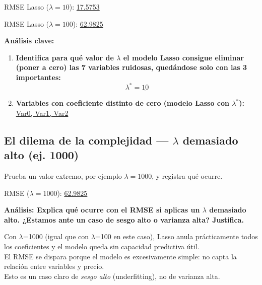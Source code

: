 \documentclass[12pt,oneside]{book}
\begin{document}
\vspace{0.4cm}
\begin{center}
\end{center}
\noindent RMSE Lasso ($\lambda=10$): \underline{17.5753}

\vspace{0.4cm}
\begin{center}
\end{center}
\noindent RMSE Lasso ($\lambda=100$): \underline{62.9825}

\newpage
\noindent\textbf{Análisis clave:}
\begin{enumerate}
    \item \textbf{Identifica para qué valor de $\lambda$ el modelo \textbf{Lasso} consigue \textbf{eliminar} (poner a cero)
    las 7 variables ruidosas, quedándose solo con las 3 importantes:}
    \[
    \lambda^{*} = \underline{10}
    \]
    \item \textbf{Variables con coeficiente distinto de cero (modelo Lasso con $\lambda^{*}$):}\\
    \underline{Var0, Var1, Var2}
\end{enumerate}

\vspace{1.0cm}

\subsection{El dilema de la complejidad — $\lambda$ demasiado alto (ej. 1000)}

\noindent Prueba un valor extremo, por ejemplo $\lambda = 1000$, y registra qué ocurre.

\vspace{0.2cm}
\begin{center}
\end{center}

\noindent RMSE ($\lambda=1000$): \underline{62.9825}

\vspace{0.4cm}
\noindent\textbf{Análisis:
Explica qué ocurre con el RMSE si aplicas un $\lambda$ demasiado alto.
¿Estamos ante un caso de \textbf{sesgo alto} o \textbf{varianza alta}? Justifica.}

Con $\lambda$=1000 (igual que con $\lambda$=100 en este caso), Lasso anula prácticamente todos los coeficientes y el modelo queda sin capacidad predictiva útil.\\
El RMSE se dispara porque el modelo es excesivamente simple: no capta la relación entre variables y precio.\\
Esto es un caso claro de \textit{sesgo alto} (underfitting), no de varianza alta.
\end{document}
